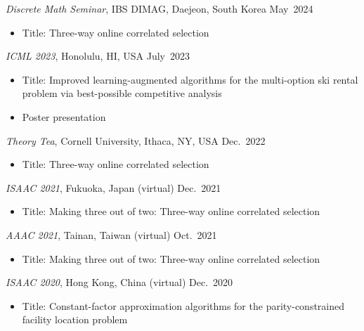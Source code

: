 \documentclass{article}
\newcommand{\killinitspace}{-0.7em}
\begin{document}
\textsl{Discrete Math Seminar}, IBS DIMAG, Daejeon, South Korea \hfill May~2024
\vspace{\killinitspace}
\begin{itemize}
\item Title: Three-way online correlated selection
\end{itemize}

\textsl{ICML 2023}, Honolulu, HI, USA \hfill July~2023
\vspace{\killinitspace}
\begin{itemize}
\item Title: Improved learning-augmented algorithms for the multi-option ski rental problem via best-possible competitive analysis
\item Poster presentation
\end{itemize}

\textsl{Theory Tea}, Cornell University, Ithaca, NY, USA \hfill Dec.~2022
\vspace{\killinitspace}
\begin{itemize}
\item Title: Three-way online correlated selection
\end{itemize}

\textsl{ISAAC 2021}, Fukuoka, Japan (virtual) \hfill Dec.~2021
\vspace{\killinitspace}
\begin{itemize}
\item Title: Making three out of two: Three-way online correlated selection
\end{itemize}

\textsl{AAAC 2021}, Tainan, Taiwan (virtual) \hfill Oct.~2021
\vspace{\killinitspace}
\begin{itemize}
\item Title: Making three out of two: Three-way online correlated selection
\end{itemize}

\textsl{ISAAC 2020}, Hong Kong, China (virtual) \hfill Dec.~2020
\vspace{\killinitspace}
\begin{itemize}
\item Title: Constant-factor approximation algorithms for the parity-constrained facility location problem
\end{itemize}

\end{document}
